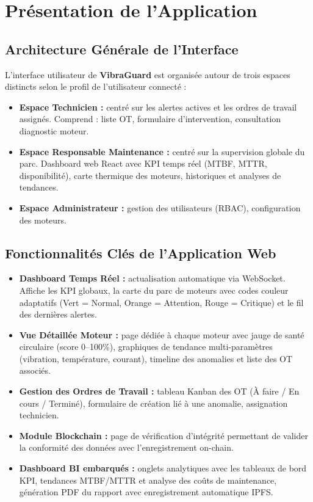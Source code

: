 \documentclass[12pt, a4paper, oneside]{report}
\newcommand{\projectname}{\textbf{VibraGuard}}
\begin{document}
\section{Présentation de l'Application}

\subsection{Architecture Générale de l'Interface}

L'interface utilisateur de \projectname{} est organisée autour de trois espaces distincts
selon le profil de l'utilisateur connecté :

\begin{itemize}
  \item \textbf{Espace Technicien :} centré sur les alertes actives et les ordres de travail
  assignés. Comprend : liste OT, formulaire d'intervention, consultation diagnostic moteur.
  \item \textbf{Espace Responsable Maintenance :} centré sur la supervision globale du parc.
  Dashboard web React avec KPI temps réel (MTBF, MTTR, disponibilité), carte thermique des
  moteurs, historiques et analyses de tendances.
  \item \textbf{Espace Administrateur :} gestion des utilisateurs (RBAC), configuration des
  moteurs.
\end{itemize}

\subsection{Fonctionnalités Clés de l'Application Web}

\begin{itemize}
  \item \textbf{Dashboard Temps Réel :} actualisation automatique via
  WebSocket. Affiche les KPI globaux, la carte du parc de moteurs avec codes couleur adaptatifs
  (Vert = Normal, Orange = Attention, Rouge = Critique) et le fil des dernières alertes.

  \item \textbf{Vue Détaillée Moteur :} page dédiée à chaque moteur avec jauge de santé
  circulaire (score 0--100\%), graphiques de tendance multi-paramètres (vibration,
  température, courant), timeline des anomalies et liste des OT associés.

  \item \textbf{Gestion des Ordres de Travail :} tableau Kanban des OT (\`{A} faire / En cours /
  Termin\'{e}), formulaire de création lié à une anomalie, assignation technicien.

  \item \textbf{Module Blockchain :} page de vérification d'intégrité permettant de valider la conformité des données avec l'enregistrement on-chain.

  \item \textbf{Dashboard BI embarqués :} onglets analytiques avec les tableaux de bord
  KPI, tendances MTBF/MTTR et analyse des coûts de maintenance,
  génération PDF du rapport avec enregistrement automatique IPFS.
\end{itemize}
\end{document}
